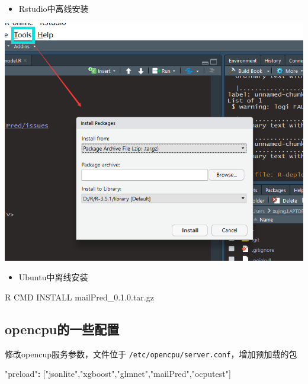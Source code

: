 \documentclass[]{book}
\newenvironment{Shaded}{\begin{snugshade}}{\end{snugshade}}
\newcommand{\FloatTok}[1]{\textcolor[rgb]{0.00,0.00,0.81}{#1}}
\newcommand{\StringTok}[1]{\textcolor[rgb]{0.31,0.60,0.02}{#1}}
\newcommand{\OperatorTok}[1]{\textcolor[rgb]{0.81,0.36,0.00}{\textbf{#1}}}
\newcommand{\NormalTok}[1]{#1}
\providecommand{\tightlist}{%
  \setlength{\itemsep}{0pt}\setlength{\parskip}{0pt}}
\begin{document}
\begin{itemize}
\tightlist
\item
  Rstudio中离线安装
\end{itemize}

\includegraphics{pic/opencpu/p14.png}

\begin{itemize}
\tightlist
\item
  Ubuntu中离线安装
\end{itemize}

\begin{Shaded}
\begin{Highlighting}[]
\NormalTok{R CMD INSTALL mailPred_}\FloatTok{0.1}\NormalTok{.}\FloatTok{0.}\NormalTok{tar.gz}
\end{Highlighting}
\end{Shaded}

\subsection{opencpu的一些配置}\label{opencpu}

修改opencup服务参数，文件位于
\texttt{/etc/opencpu/server.conf}，增加预加载的包

\begin{Shaded}
\begin{Highlighting}[]
\StringTok{"preload"}\OperatorTok{:}\StringTok{ }\NormalTok{[}\StringTok{"jsonlite"}\NormalTok{,}\StringTok{"xgboost"}\NormalTok{,}\StringTok{"glmnet"}\NormalTok{,}\StringTok{"mailPred"}\NormalTok{,}\StringTok{"ocputest"}\NormalTok{]}
\end{Highlighting}
\end{Shaded}
\end{document}
